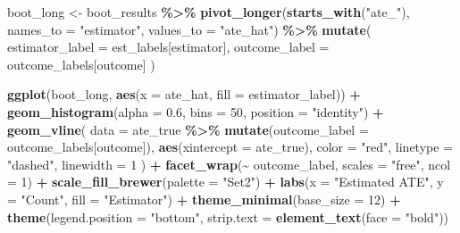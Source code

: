 \documentclass[
]{article}
\newenvironment{Shaded}{\begin{snugshade}}{\end{snugshade}}
\newcommand{\AttributeTok}[1]{\textcolor[rgb]{0.13,0.29,0.53}{#1}}
\newcommand{\DecValTok}[1]{\textcolor[rgb]{0.00,0.00,0.81}{#1}}
\newcommand{\FloatTok}[1]{\textcolor[rgb]{0.00,0.00,0.81}{#1}}
\newcommand{\FunctionTok}[1]{\textcolor[rgb]{0.13,0.29,0.53}{\textbf{#1}}}
\newcommand{\NormalTok}[1]{#1}
\newcommand{\OtherTok}[1]{\textcolor[rgb]{0.56,0.35,0.01}{#1}}
\newcommand{\SpecialCharTok}[1]{\textcolor[rgb]{0.81,0.36,0.00}{\textbf{#1}}}
\newcommand{\StringTok}[1]{\textcolor[rgb]{0.31,0.60,0.02}{#1}}
\begin{document}
\begin{Shaded}
\begin{Highlighting}[]
\NormalTok{boot\_long }\OtherTok{\textless{}{-}}\NormalTok{ boot\_results }\SpecialCharTok{\%\textgreater{}\%}
  \FunctionTok{pivot\_longer}\NormalTok{(}\FunctionTok{starts\_with}\NormalTok{(}\StringTok{"ate\_"}\NormalTok{),}
               \AttributeTok{names\_to =} \StringTok{"estimator"}\NormalTok{, }\AttributeTok{values\_to =} \StringTok{"ate\_hat"}\NormalTok{) }\SpecialCharTok{\%\textgreater{}\%}
  \FunctionTok{mutate}\NormalTok{(}
    \AttributeTok{estimator\_label =}\NormalTok{ est\_labels[estimator],}
    \AttributeTok{outcome\_label =}\NormalTok{ outcome\_labels[outcome]}
\NormalTok{  )}

\FunctionTok{ggplot}\NormalTok{(boot\_long, }\FunctionTok{aes}\NormalTok{(}\AttributeTok{x =}\NormalTok{ ate\_hat, }\AttributeTok{fill =}\NormalTok{ estimator\_label)) }\SpecialCharTok{+}
  \FunctionTok{geom\_histogram}\NormalTok{(}\AttributeTok{alpha =} \FloatTok{0.6}\NormalTok{, }\AttributeTok{bins =} \DecValTok{50}\NormalTok{, }\AttributeTok{position =} \StringTok{"identity"}\NormalTok{) }\SpecialCharTok{+}
  \FunctionTok{geom\_vline}\NormalTok{(}
    \AttributeTok{data =}\NormalTok{ ate\_true }\SpecialCharTok{\%\textgreater{}\%} \FunctionTok{mutate}\NormalTok{(}\AttributeTok{outcome\_label =}\NormalTok{ outcome\_labels[outcome]),}
    \FunctionTok{aes}\NormalTok{(}\AttributeTok{xintercept =}\NormalTok{ ate\_true),}
    \AttributeTok{color =} \StringTok{"red"}\NormalTok{, }\AttributeTok{linetype =} \StringTok{"dashed"}\NormalTok{, }\AttributeTok{linewidth =} \DecValTok{1}
\NormalTok{  ) }\SpecialCharTok{+}
  \FunctionTok{facet\_wrap}\NormalTok{(}\SpecialCharTok{\textasciitilde{}}\NormalTok{ outcome\_label, }\AttributeTok{scales =} \StringTok{"free"}\NormalTok{, }\AttributeTok{ncol =} \DecValTok{1}\NormalTok{) }\SpecialCharTok{+}
  \FunctionTok{scale\_fill\_brewer}\NormalTok{(}\AttributeTok{palette =} \StringTok{"Set2"}\NormalTok{) }\SpecialCharTok{+}
  \FunctionTok{labs}\NormalTok{(}\AttributeTok{x =} \StringTok{"Estimated ATE"}\NormalTok{, }\AttributeTok{y =} \StringTok{"Count"}\NormalTok{, }\AttributeTok{fill =} \StringTok{"Estimator"}\NormalTok{) }\SpecialCharTok{+}
  \FunctionTok{theme\_minimal}\NormalTok{(}\AttributeTok{base\_size =} \DecValTok{12}\NormalTok{) }\SpecialCharTok{+}
  \FunctionTok{theme}\NormalTok{(}\AttributeTok{legend.position =} \StringTok{"bottom"}\NormalTok{, }\AttributeTok{strip.text =} \FunctionTok{element\_text}\NormalTok{(}\AttributeTok{face =} \StringTok{"bold"}\NormalTok{))}
\end{Highlighting}
\end{Shaded}
\end{document}
